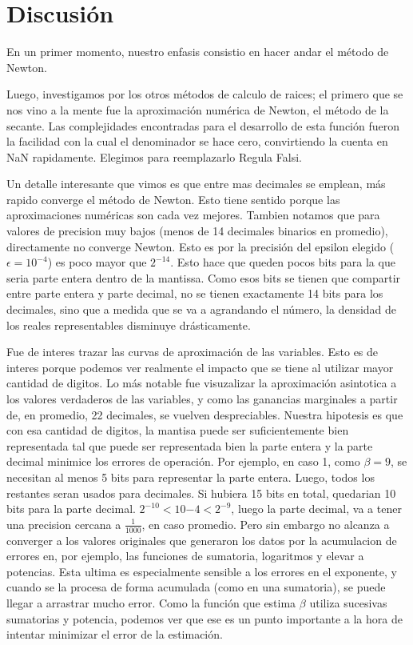 \section{Discusi\'on}

En un primer momento, nuestro enfasis consistio en hacer andar el m\'etodo de Newton.


Luego, investigamos por los otros m\'etodos de calculo de raices; el primero que se nos vino a la mente
fue la aproximaci\'on num\'erica de Newton, el m\'etodo de la secante.
Las complejidades encontradas para el desarrollo de esta funci\'on fueron la facilidad con la cual
el denominador se hace cero, convirtiendo la cuenta en NaN rapidamente. Elegimos para reemplazarlo
Regula Falsi.


Un detalle interesante que vimos es que entre mas decimales se emplean, m\'as rapido converge el m\'etodo de Newton. 
Esto tiene sentido porque las aproximaciones num\'ericas son cada vez mejores. 
Tambien notamos que para valores de precision muy bajos (menos de 14 decimales binarios en promedio), directamente no converge Newton. 
Esto es por la precisi\'on del epsilon elegido ($\epsilon = 10^{-4}$) es poco mayor que $2^{-14}$. Esto hace que queden pocos bits para la que seria
parte entera dentro de la mantissa. Como esos bits se tienen que compartir entre parte entera y parte decimal, no se tienen exactamente
14 bits para los decimales, sino que a medida que se va a agrandando el n\'umero, la densidad de los reales representables disminuye dr\'asticamente.


Fue de interes trazar las curvas de aproximaci\'on de las variables. Esto es de interes porque podemos ver 
realmente el impacto que se tiene al utilizar mayor cantidad de digitos. Lo m\'as notable fue visuzalizar la 
aproximaci\'on asintotica a los valores verdaderos de las variables, y como las ganancias marginales a partir de,
en promedio, 22 decimales, se vuelven despreciables. Nuestra hipotesis es que con esa cantidad de digitos, la mantisa
puede ser suficientemente bien representada tal que puede ser representada bien la parte entera y la parte decimal 
minimice los errores de operaci\'on. Por ejemplo, en caso 1, como $\beta = 9$, se necesitan al menos 5 bits para representar la parte entera.
Luego, todos los restantes seran usados para decimales. Si hubiera 15 bits en total, quedarian 10 bits para la parte decimal. $2^{-10}<10{-4}<2^{-9}$, luego
la parte decimal, va a tener una precision cercana a $\frac{1}{1000}$, en caso promedio. Pero sin embargo no alcanza
a converger a los valores originales que generaron los datos por la acumulacion de errores en, por ejemplo, las funciones
de sumatoria, logaritmos y elevar a potencias. Esta ultima es especialmente sensible a los errores en el exponente, y cuando 
se la procesa de forma acumulada (como en una sumatoria), se puede llegar a arrastrar mucho error. Como la funci\'on que estima
$\beta$ utiliza sucesivas sumatorias y potencia, podemos ver que ese es un punto importante a la hora de intentar minimizar el error de 
la estimaci\'on.
